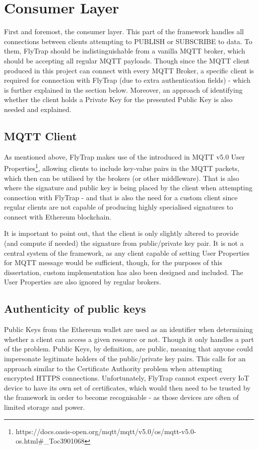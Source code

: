 \section{Consumer Layer}
First and foremost, the consumer layer. This part of the framework handles all connections between clients attempting to PUBLISH or SUBSCRIBE to data. To them, FlyTrap should be indistinguishable from a vanilla MQTT broker, which should be accepting all regular MQTT payloads. Though since the MQTT client produced in this project can connect with every MQTT Broker, a specific client is required for connection with FlyTrap (due to extra authentication fields) - which is further explained in the section below. Moreover, an approach of identifying whether the client holds a Private Key for the presented Public Key is also needed and explained. 
\subsection{MQTT Client}
As mentioned above, FlyTrap makes use of the introduced in MQTT v5.0 User Properties\footnote{https://docs.oasis-open.org/mqtt/mqtt/v5.0/os/mqtt-v5.0-os.html\#\_Toc3901068}, allowing clients to include key-value pairs in the MQTT packets, which then can be utilised by the brokers (or other middleware). That is also where the signature and public key is being placed by the client when attempting connection with FlyTrap - and that is also the need for a custom client since regular clients are not capable of producing highly specialised signatures to connect with Ethereum blockchain.

It is important to point out, that the client is only slightly altered to provide (and compute if needed) the signature from public/private key pair. It is not a central system of the framework, as any client capable of setting User Properties for MQTT message would be sufficient, though, for the purposes of this dissertation, custom implementation has also been designed and included. The User Properties are also ignored by regular brokers.

\subsection{Authenticity of public keys}
Public Keys from the Ethereum wallet are used as an identifier when determining whether a client can access a given resource or not. Though it only handles a part of the problem. Public Keys, by definition, are public, meaning that anyone could impersonate legitimate holders of the public/private key pairs. This calls for an approach similar to the Certificate Authority problem when attempting encrypted HTTPS connections. Unfortunately, FlyTrap cannot expect every IoT device to have its own set of certificates, which would then need to be trusted by the framework in order to become recognisable - as those devices are often of limited storage and power.

